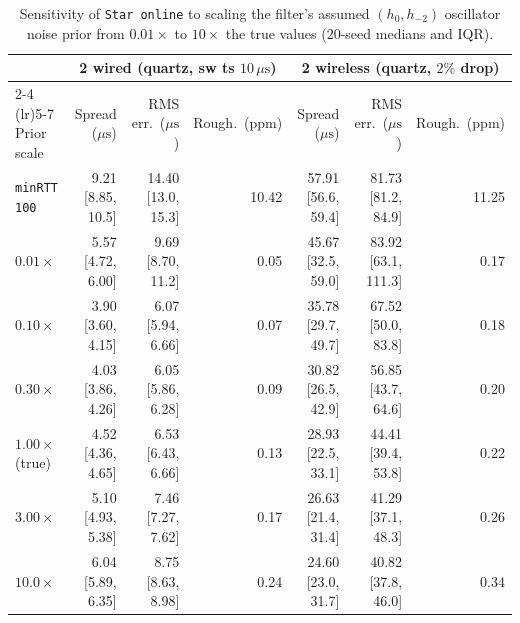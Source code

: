 \documentclass[11pt,a4paper]{article}
\theoremstyle{definition}
\begin{document}
\begin{table}[htb]
\centering
\scriptsize
\setlength{\tabcolsep}{3.5pt}
\begin{tabular}{@{}l rrr rrr@{}}
\toprule
 & \multicolumn{3}{c}{2 wired (quartz, sw ts $10\,\mu\text{s}$)} & \multicolumn{3}{c}{2 wireless (quartz, $2\%$ drop)} \\
\cmidrule(lr){2-4} \cmidrule(lr){5-7}
Prior scale & Spread ($\mu\text{s}$) & RMS err.\ ($\mu\text{s}$) & Rough.\ (ppm) & Spread ($\mu\text{s}$) & RMS err.\ ($\mu\text{s}$) & Rough.\ (ppm) \\
\midrule
\texttt{minRTT 100} & 9.21 [8.85, 10.5] & 14.40 [13.0, 15.3] & 10.42 & 57.91 [56.6, 59.4] & 81.73 [81.2, 84.9] & 11.25 \\
\midrule
$0.01\times$ & 5.57 [4.72, 6.00] & 9.69 [8.70, 11.2] & 0.05 & 45.67 [32.5, 59.0] & 83.92 [63.1, 111.3] & 0.17 \\
$0.10\times$ & 3.90 [3.60, 4.15] & 6.07 [5.94, 6.66] & 0.07 & 35.78 [29.7, 49.7] & 67.52 [50.0, 83.8] & 0.18 \\
$0.30\times$ & 4.03 [3.86, 4.26] & 6.05 [5.86, 6.28] & 0.09 & 30.82 [26.5, 42.9] & 56.85 [43.7, 64.6] & 0.20 \\
$1.00\times$ (true) & 4.52 [4.36, 4.65] & 6.53 [6.43, 6.66] & 0.13 & 28.93 [22.5, 33.1] & 44.41 [39.4, 53.8] & 0.22 \\
$3.00\times$ & 5.10 [4.93, 5.38] & 7.46 [7.27, 7.62] & 0.17 & 26.63 [21.4, 31.4] & 41.29 [37.1, 48.3] & 0.26 \\
$10.0\times$ & 6.04 [5.89, 6.35] & 8.75 [8.63, 8.98] & 0.24 & 24.60 [23.0, 31.7] & 40.82 [37.8, 46.0] & 0.34 \\
\bottomrule
\end{tabular}
\caption{Sensitivity of \texttt{Star online} to scaling the filter's assumed
$(h_0, h_{-2})$ oscillator noise prior from $0.01\times$ to $10\times$ the true
values (20-seed medians and IQR).}
\label{tab:prior}
\end{table}
\end{document}
